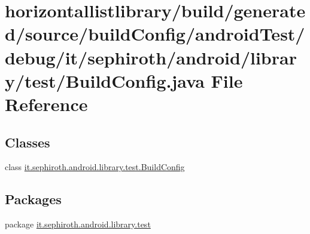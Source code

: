 \hypertarget{horizontallistlibrary_2build_2generated_2source_2build_config_2android_test_2debug_2it_2sephirote4c94bf8f9ee1fef28f9cae07127120d}{}\section{horizontallistlibrary/build/generated/source/build\+Config/android\+Test/debug/it/sephiroth/android/library/test/\+Build\+Config.java File Reference}
\label{horizontallistlibrary_2build_2generated_2source_2build_config_2android_test_2debug_2it_2sephirote4c94bf8f9ee1fef28f9cae07127120d}
\subsection*{Classes}
\begin{DoxyCompactItemize}
\item 
class \hyperlink{classit_1_1sephiroth_1_1android_1_1library_1_1test_1_1_build_config}{it.\+sephiroth.\+android.\+library.\+test.\+Build\+Config}
\end{DoxyCompactItemize}
\subsection*{Packages}
\begin{DoxyCompactItemize}
\item 
package \hyperlink{namespaceit_1_1sephiroth_1_1android_1_1library_1_1test}{it.\+sephiroth.\+android.\+library.\+test}
\end{DoxyCompactItemize}
